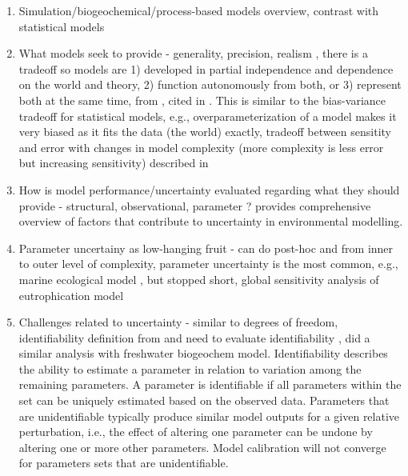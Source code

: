 \documentclass[letterpaper,12pt,oneside]{article}\usepackage[]{graphicx}\usepackage[]{color}
\begin{document}
\begin{enumerate}
\item Simulation/biogeochemical/process-based models overview, contrast with statistical models
\item What models seek to provide - generality, precision, realism \cite{Levins66}, there is a tradeoff so models are 1) developed in partial independence and dependence on the world and theory, 2) function autonomously from both, or 3) represent both at the same time, from \cite{Morrison99}, cited in \cite{Ganju16}.  This is similar to the bias-variance tradeoff for statistical models, e.g., overparameterization of a model makes it very biased as it fits the data (the world) exactly, tradeoff between sensitity and error with changes in model complexity (more complexity is less error but increasing sensitivity) described in \cite{Snowling01}
\item How is model performance/uncertainty evaluated regarding what they should provide - structural, observational, parameter \cite{Beck87}? \cite{Refsgaard07} provides comprehensive overview of factors that contribute to uncertainty in environmental modelling.
\item Parameter uncertainy as low-hanging fruit - can do post-hoc and from inner to outer level of complexity, parameter uncertainty is the most common, e.g., marine ecological model \cite{Mateus15}, but stopped short, global sensitivity analysis of eutrophication model \cite{Estrada10}
\item Challenges related to uncertainty - similar to degrees of freedom, identifiability definition from \cite{Brun01} and need to evaluate identifiability \cite{Fasham06}, \cite{Omlin01} did a similar analysis with freshwater biogeochem model.
Identifiability describes the ability to estimate a parameter in relation to variation among the remaining parameters.  A parameter is identifiable if all parameters within the set can be uniquely estimated based on the observed data.  Parameters that are unidentifiable typically produce similar model outputs for a given relative perturbation, i.e., the effect of altering one parameter can be undone by altering one or more other parameters.  Model calibration will not converge for parameters sets that are unidentifiable. 
\end{enumerate}
\end{document}
